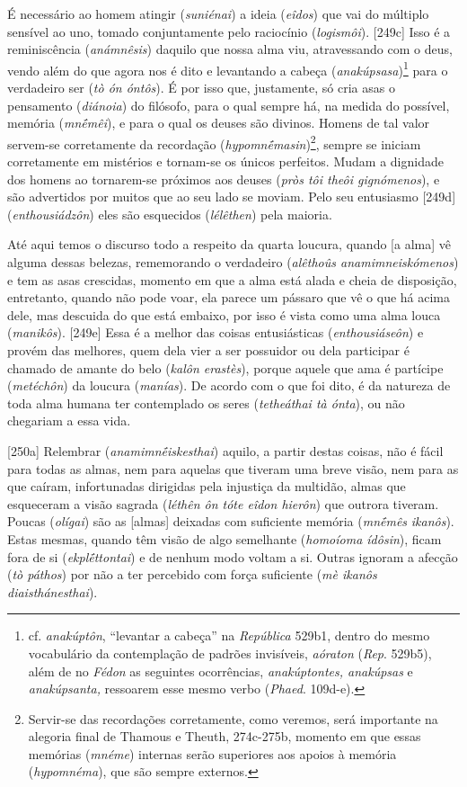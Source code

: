 É necessário ao homem atingir (\emph{suniénai}) a ideia (\emph{eîdos})
que vai do múltiplo sensível ao uno, tomado conjuntamente pelo
raciocínio (\emph{logismôi}). {[}249c{]} Isso é a reminiscência
(\emph{anámnêsis}) daquilo que nossa alma viu, atravessando com o deus,
vendo além do que agora nos é dito e levantando a cabeça
(\emph{anakúpsasa})\footnote{cf. \emph{anakúptôn}, ``levantar a cabeça''
  na \emph{República} 529b1, dentro do mesmo vocabulário da contemplação
  de padrões invisíveis, \emph{aóraton} (\emph{Rep}. 529b5), além de no
  \emph{Fédon} as seguintes ocorrências, \emph{anakúptontes, anakúpsas}
  e \emph{anakúpsanta,} ressoarem esse mesmo verbo (\emph{Phaed}.
  109d-e).} para o verdadeiro ser (\emph{tò ón óntôs}). É por isso que,
justamente, só cria asas o pensamento (\emph{diánoia}) do filósofo, para
o qual sempre há, na medida do possível, memória (\emph{mnḗmêi}), e para
o qual os deuses são divinos. Homens de tal valor servem-se corretamente
da recordação (\emph{hypomnḗmasin})\footnote{Servir-se das recordações
  corretamente, como veremos, será importante na alegoria final de
  Thamous e Theuth, 274c-275b, momento em que essas memórias
  (\emph{mnéme}) internas serão superiores aos apoios à memória
  (\emph{hypomnéma}), que são sempre externos.}, sempre se iniciam
corretamente em mistérios e tornam-se os únicos perfeitos. Mudam a
dignidade dos homens ao tornarem-se próximos aos deuses (\emph{pròs tôi
theôi gignómenos}), e são advertidos por muitos que ao seu lado se
moviam. Pelo seu entusiasmo {[}249d{]} (\emph{enthousiádzôn}) eles são
esquecidos (\emph{lélêthen}) pela maioria.

Até aqui temos o discurso todo a respeito da quarta loucura, quando {[}a
alma{]} vê alguma dessas belezas, rememorando o verdadeiro
(\emph{alêthoûs anamimneiskómenos}) e tem as asas crescidas, momento em
que a alma está alada e cheia de disposição, entretanto, quando não pode
voar, ela parece um pássaro que vê o que há acima dele, mas descuida do
que está embaixo, por isso é vista como uma alma louca (\emph{manikôs}).
{[}249e{]} Essa é a melhor das coisas entusiásticas
(\emph{enthousiáseôn}) e provém das melhores, quem dela vier a ser
possuidor ou dela participar é chamado de amante do belo (\emph{kalôn
erastès}), porque aquele que ama é partícipe (\emph{metéchôn}) da
loucura (\emph{manías}). De acordo com o que foi dito, é da natureza de
toda alma humana ter contemplado os seres (\emph{tetheáthai tà ónta}),
ou não chegariam a essa vida.

{[}250a{]} Relembrar (\emph{anamimnḗiskesthai}) aquilo, a partir destas
coisas, não é fácil para todas as almas, nem para aquelas que tiveram
uma breve visão, nem para as que caíram, infortunadas dirigidas pela
injustiça da multidão, almas que esqueceram a visão sagrada
(\emph{léthên ôn tóte eîdon hierôn}) que outrora tiveram. Poucas
(\emph{olígai}) são as {[}almas{]} deixadas com suficiente memória
(\emph{mnḗmês} \emph{ikanôs}). Estas mesmas, quando têm visão de algo
semelhante (\emph{homoíoma ídôsin}), ficam fora de si
(\emph{ekplḗttontai}) e de nenhum modo voltam a si. Outras ignoram a
afecção (\emph{tò páthos}) por não a ter percebido com força suficiente
(\emph{mè ikanôs} \emph{diaisthánesthai}).

